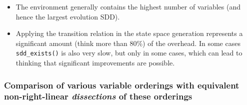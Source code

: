 \documentclass[12]{article}
\begin{document}
\begin{itemize}
\item The environment generally contains the highest number of variables (and hence the largest evolution SDD). 
\item Applying the transition relation in the state space generation represents a significant amount (think more than 80\%) of the overhead. In some cases \texttt{sdd\_exists()} is also very slow, but only in some cases, which can lead to thinking that significant improvements are possible.
 
\end{itemize}

\subsubsection{Comparison of various variable orderings with equivalent non-right-linear \textit{dissections} of these orderings}
\end{document}
